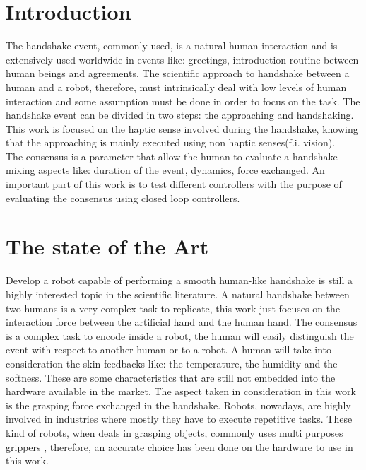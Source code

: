 \chapter*{Introduction}
The handshake event, commonly used, is a natural human interaction and is extensively used worldwide in events like: greetings, introduction routine between human beings and agreements. 
The scientific approach to handshake between a human and a robot, therefore, must intrinsically deal with low levels of human interaction and some assumption must be done in order to focus on the task.
The handshake event can be divided in two steps: the approaching and handshaking. This work is focused on the haptic sense involved during the handshake, knowing that the approaching is mainly executed using non haptic senses(f.i. vision).\\ The consensus is a parameter that allow the human to evaluate a handshake mixing aspects like: duration of the event, dynamics, force exchanged.
An important part of this work is to test different controllers with the purpose of evaluating the consensus using closed loop controllers. 
  


\chapter{The state of the Art}
Develop a robot capable of performing a smooth human-like handshake is still a highly interested topic in the scientific literature.
A natural handshake between two humans is a very complex task to replicate, this work just focuses on the interaction force between the artificial hand and the human hand.
The consensus is a complex task to encode inside a robot, the human will easily distinguish the event with respect to another human or to a robot. A human will take into consideration the skin feedbacks like: the temperature, the humidity and the softness. These are some characteristics that are still not embedded into the hardware available in the market. The aspect taken in consideration in this work is the grasping force exchanged in the handshake. 
Robots, nowadays, are highly involved in industries where mostly they have to execute repetitive tasks. These kind of robots, when deals in grasping objects, commonly uses multi purposes grippers \cite{multipurposegripper}, therefore, an accurate choice has been done on the hardware to use in this work. 


